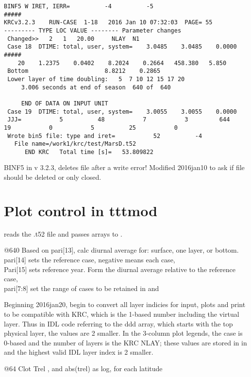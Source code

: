 \documentclass{article}
\begin{document}
\begin{verbatim}
BINF5 W IRET, IERR=          -4          -5
#####                            
KRCv3.2.3    RUN-CASE  1-18   2016 Jan 10 07:32:03  PAGE= 55
--------- TYPE LOC VALUE -------- Parameter changes
 Changed>>   2   1   20.00     NLAY  N1    
 Case 18  DTIME: total, user, system=    3.0485    3.0485    0.0000
#####
    20    1.2375    0.0402    8.2024    0.2664   458.380   5.850
 Bottom                      8.8212    0.2865
 Lower layer of time doubling:   5  7 10 12 15 17 20
     3.006 seconds at end of season  640 of  640

     END OF DATA ON INPUT UNIT
 Case 19  DTIME: total, user, system=    3.0055    3.0055    0.0000
 JJJ=           5          48           7           3         644          19           0           5          25           0
 Wrote bin5 file: type and iret=           52          -4
   File name=/work1/krc/test/MarsD.t52                                                       
      END KRC   Total time [s]=   53.809822 
\end{verbatim} 
BINF5 in v 3.2.3, deletes file after a write error!  Modified 2016jan10 to ask if file should be deleted or only closed.


\section{Plot control in tttmod}
 reads the .t52 file and passes arrays to .

@640 Based on pari[13], calc diurnal average  for: surface, one layer, or bottom.
\\ pari[14] sets the reference case, negative means each case, 
\\ Pari[15] sets reference year. Form the diurnal average relative to the reference case, 
\\ pari[7:8] set the range of cases to be retained  in   and 

Beginning 2016jan20, begin to convert all  layer indicies for input,
plots and print to be compatible with KRC, which is the 1-based number including
the virtual layer. Thus in IDL code referring to the ddd array, which starts
with the top physical layer, the values are 2 smaller.  In the 3-column
 plot legends, the case is 0-based and the number of layers is the KRC
NLAY; these values are stored in  in  and the highest valid
IDL layer index is 2 smaller.

@64 Clot Trel , and abs(trel) as log, for each latitude 
\end{document}

